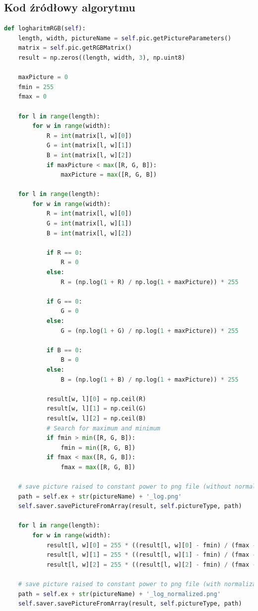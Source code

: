 \documentclass[a4paper,12pt, titlepage]{report}
\begin{document}
\subsection*{Kod źródłowy algorytmu}
\begin{lstlisting}[language=Python]
    def logharitmRGB(self):
    length, width, pictureName = self.pic.getPictureParameters()
    matrix = self.pic.getRGBMatrix()
    result = np.zeros((length, width, 3), np.uint8)

    maxPicture = 0
    fmin = 255
    fmax = 0

    for l in range(length):
        for w in range(width):
            R = int(matrix[l, w][0])
            G = int(matrix[l, w][1])
            B = int(matrix[l, w][2])
            if maxPicture < max([R, G, B]):
                maxPicture = max([R, G, B])

    for l in range(length):
        for w in range(width):
            R = int(matrix[l, w][0])
            G = int(matrix[l, w][1])
            B = int(matrix[l, w][2])

            if R == 0:
                R = 0
            else:
                R = (np.log(1 + R) / np.log(1 + maxPicture)) * 255

            if G == 0:
                G = 0
            else:
                G = (np.log(1 + G) / np.log(1 + maxPicture)) * 255

            if B == 0:
                B = 0
            else:
                B = (np.log(1 + B) / np.log(1 + maxPicture)) * 255

            result[w, l][0] = np.ceil(R)
            result[w, l][1] = np.ceil(G)
            result[w, l][2] = np.ceil(B)
            # Search for maximum and minimum
            if fmin > min([R, G, B]):
                fmin = min([R, G, B])
            if fmax < max([R, G, B]):
                fmax = max([R, G, B])

    # save picture raised to constant power to png file (without normalization)
    path = self.ex + str(pictureName) + '_log.png'
    self.saver.savePictureFromArray(result, self.pictureType, path)

    for l in range(length):
        for w in range(width):
            result[l, w][0] = 255 * ((result[l, w][0] - fmin) / (fmax - fmin))
            result[l, w][1] = 255 * ((result[l, w][1] - fmin) / (fmax - fmin))
            result[l, w][2] = 255 * ((result[l, w][2] - fmin) / (fmax - fmin))

    # save picture raised to constant power to png file (with normalization)
    path = self.ex + str(pictureName) + '_log_normalized.png'
    self.saver.savePictureFromArray(result, self.pictureType, path)
\end{lstlisting}
\end{document}
